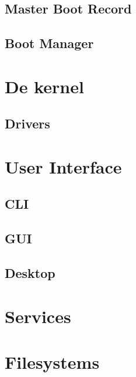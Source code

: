 \documentclass[a4paper,12pt,twoside,openright,titlepage]{book}
\begin{document}
\section{Master Boot Record}

\section{Boot Manager}


\chapter{De kernel}

\section{Drivers}


\chapter{User Interface}

\section{CLI}

\section{GUI}

\section{Desktop}


\chapter{Services}


\chapter{Filesystems}


\backmatter
\printindex
\end{document}
